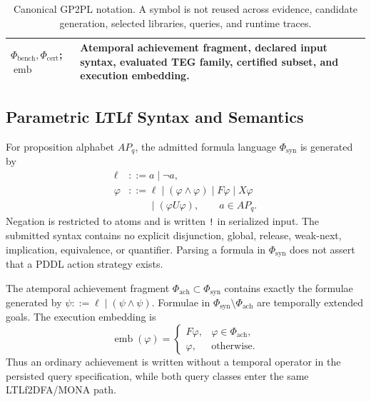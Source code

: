 \begin{table}[htbp]
\begin{tabular}{@{}
>{\raggedright\arraybackslash}p{}
>{\raggedright\arraybackslash}p{}
>{\raggedright\arraybackslash}p{}
>{\raggedright\arraybackslash}p{}@{}}
$\Phi_{\mathrm{bench}},\Phi_{\mathrm{cert}}$; \newline
$\operatorname{emb}$ & Atemporal achievement fragment, declared input syntax,
evaluated TEG family, certified subset, and execution embedding. \\
\bottomrule
\end{tabular}
\caption{Canonical GP2PL notation. A symbol is not reused across evidence,
candidate generation, selected libraries, queries, and runtime traces.}
\label{tab:canonical-notation}
\end{table}
\FloatBarrier

\subsection{Parametric LTLf Syntax and Semantics}

\begin{definition}
For proposition alphabet $AP_q$, the admitted formula language
$\Phi_{\mathrm{syn}}$ is generated by
\[
\begin{aligned}
\ell &::= a\mid\neg a,\\
\varphi &::= \ell\mid(\varphi\land\varphi)\mid F\varphi\mid X\varphi\\
&\phantom{{}::={}}\mid(\varphi U\varphi),\qquad a\in AP_q.
\end{aligned}
\]
Negation is restricted to atoms and is written \texttt{!} in serialized input.
The submitted syntax contains no explicit disjunction, global, release,
weak-next, implication, equivalence, or quantifier. Parsing a formula in
$\Phi_{\mathrm{syn}}$ does not assert that a PDDL action strategy exists.

The atemporal achievement fragment $\Phi_{\mathrm{ach}}\subset
\Phi_{\mathrm{syn}}$ contains exactly the formulae generated by
$\psi::=\ell\mid(\psi\land\psi)$. Formulae in
$\Phi_{\mathrm{syn}}\setminus\Phi_{\mathrm{ach}}$ are temporally extended goals.
The execution embedding is
\[
\operatorname{emb}(\varphi)=
\begin{cases}
F\varphi,&\varphi\in\Phi_{\mathrm{ach}},\\
\varphi,&\text{otherwise}.
\end{cases}
\]
Thus an ordinary achievement is written without a temporal operator in the
persisted query specification, while both query classes enter the same
LTLf2DFA/MONA path.
\end{definition}

